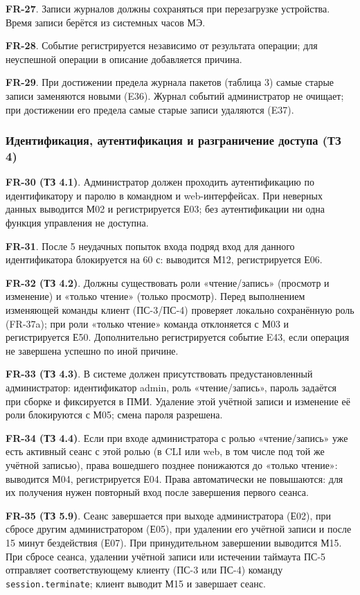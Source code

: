 \documentclass[13pt,a4paper,final]{article}
\begin{document}
	\textbf{FR-27}. Записи журналов должны сохраняться при перезагрузке устройства. Время записи берётся из системных часов МЭ.
	
	\textbf{FR-28}. Событие регистрируется независимо от результата операции; для неуспешной операции в описание добавляется причина.
	
	\textbf{FR-29}. При достижении предела журнала пакетов (таблица 3) самые старые записи заменяются новыми (E36). Журнал событий администратор не очищает; при достижении его предела самые старые записи удаляются (E37).
	
	\subsubsection{Идентификация, аутентификация и разграничение доступа (ТЗ 4)}
	
	\textbf{FR-30 (ТЗ 4.1)}. Администратор должен проходить аутентификацию по идентификатору и паролю в командном и web-интерфейсах. При неверных данных выводится М02 и регистрируется Е03; без аутентификации ни одна функция управления не доступна.
	
	\textbf{FR-31}. После 5 неудачных попыток входа подряд вход для данного идентификатора блокируется на 60 с: выводится М12, регистрируется Е06.
	
	\textbf{FR-32 (ТЗ 4.2)}. Должны существовать роли «чтение/запись» (просмотр и изменение) и «только чтение» (только просмотр). {Перед выполнением изменяющей команды клиент (ПС-3/ПС-4) проверяет локально сохранённую роль (FR-37a);} при роли «только чтение» команда отклоняется с М03 и регистрируется Е50. Дополнительно регистрируется событие E43, если операция не завершена успешно по иной причине.
	
	\textbf{FR-33 (ТЗ 4.3)}. В системе должен присутствовать предустановленный администратор: идентификатор admin, роль «чтение/запись», пароль задаётся при сборке и фиксируется в ПМИ. Удаление этой учётной записи и изменение её роли блокируются с М05; смена пароля разрешена.
	
	\textbf{FR-34 (ТЗ 4.4)}. Если при входе администратора с ролью «чтение/запись» уже есть активный сеанс с этой ролью (в CLI или web, в том числе под той же учётной записью), права вошедшего позднее понижаются до «только чтение»: выводится М04, регистрируется Е04. Права автоматически не повышаются: для их получения нужен повторный вход после завершения первого сеанса.
	
	\textbf{FR-35 (ТЗ 5.9)}. Сеанс завершается при выходе администратора (Е02), при сбросе другим администратором (Е05), при удалении его учётной записи и после 15 минут бездействия (Е07). При принудительном завершении выводится М15. {При сбросе сеанса, удалении учётной записи или истечении таймаута ПС-5 отправляет соответствующему клиенту (ПС-3 или ПС-4) команду \texttt{session.terminate}; клиент выводит М15 и завершает сеанс.}
	
\end{document}
